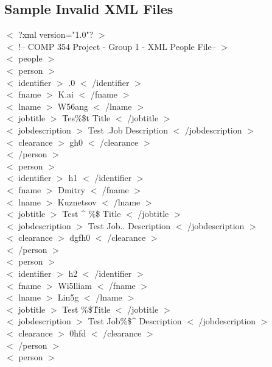 \documentclass[12pt]{article}
\newcommand{\tab}{\hspace*{2em}}
\begin{document}
\subsection{Sample Invalid XML Files}
{
 $<$ ?xml version="1.0"? $>$ 
\\ $<$ !-- COMP 354 Project - Group 1 - XML People File-- $>$ 
\\ $<$ people $>$ 
\\ \tab$<$ person $>$ 
\\ \tab\tab $<$ identifier $>$ .0 $<$ /identifier $>$ 
\\ \tab\tab $<$ fname $>$ K.ai $<$ /fname $>$ 
\\ \tab\tab $<$ lname $>$ W56ang $<$ /lname $>$ 
\\ \tab\tab $<$ jobtitle $>$  Tes\%\$t Title $<$ /jobtitle $>$ 
\\ \tab\tab $<$ jobdescription $>$ Test .Job Description $<$ /jobdescription $>$ 
\\ \tab\tab $<$ clearance $>$ gh0 $<$ /clearance $>$ 
\\ \tab$<$ /person $>$ 
\\ \tab$<$ person $>$ 
\\ \tab\tab $<$ identifier $>$ h1 $<$ /identifier $>$ 
\\ \tab\tab $<$ fname $>$ Dmitry $<$ /fname $>$ 
\\ \tab\tab $<$ lname $>$ Kuznetsov $<$ /lname $>$ 
\\ \tab\tab $<$ jobtitle $>$ Test \^{} \%\$ Title $<$ /jobtitle $>$ 
\\ \tab\tab $<$ jobdescription $>$ Test Job.. Description $<$ /jobdescription $>$ 
\\ \tab\tab $<$ clearance $>$ dgfh0 $<$ /clearance $>$ 
\\ \tab$<$ /person $>$ 
\\ \tab$<$ person $>$ 
\\ \tab\tab $<$ identifier $>$ h2 $<$ /identifier $>$ 
\\ \tab\tab $<$ fname $>$ Wi5lliam $<$ /fname $>$ 
\\ \tab\tab $<$ lname $>$ Lin5g $<$ /lname $>$ 
\\ \tab\tab $<$ jobtitle $>$ Test \%\$\^Title $<$ /jobtitle $>$ 
\\ \tab\tab $<$ jobdescription $>$ Test Job\%\$\^{} Description $<$ /jobdescription $>$ 
\\ \tab\tab $<$ clearance $>$ 0hfd $<$ /clearance $>$ 
\\ \tab$<$ /person $>$ 
\\ \tab$<$ person $>$ 
}
\end{document}
